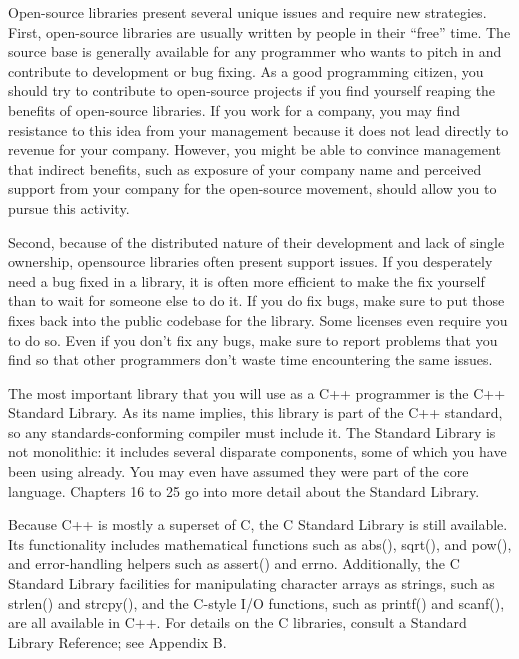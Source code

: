 Open-source libraries present several unique issues and require new strategies. First, open-source libraries are usually written by people in their “free” time. The source base is generally available for any programmer who wants to pitch in and contribute to development or bug fixing. As a good programming citizen, you should try to contribute to open-source projects if you find yourself reaping the benefits of open-source libraries. If you work for a company, you may find resistance to this idea from your management because it does not lead directly to revenue for your company. However, you might be able to convince management that indirect benefits, such as exposure of your company name and perceived support from your company for the open-source movement, should allow you to pursue this activity.

Second, because of the distributed nature of their development and lack of single ownership, opensource libraries often present support issues. If you desperately need a bug fixed in a library, it is often more efficient to make the fix yourself than to wait for someone else to do it. If you do fix bugs, make sure to put those fixes back into the public codebase for the library. Some licenses even require you to do so. Even if you don’t fix any bugs, make sure to report problems that you find so that other programmers don’t waste time encountering the same issues.


The most important library that you will use as a C++ programmer is the C++ Standard Library. As its name implies, this library is part of the C++ standard, so any standards-conforming compiler must include it. The Standard Library is not monolithic: it includes several disparate components, some of which you have been using already. You may even have assumed they were part of the core language. Chapters 16 to 25 go into more detail about the Standard Library.


Because C++ is mostly a superset of C, the C Standard Library is still available. Its functionality includes mathematical functions such as abs(), sqrt(), and pow(), and error-handling helpers such as assert() and errno. Additionally, the C Standard Library facilities for manipulating character arrays as strings, such as strlen() and strcpy(), and the C-style I/O functions, such as printf() and scanf(), are all available in C++. For details on the C libraries, consult a Standard Library Reference; see Appendix B.

